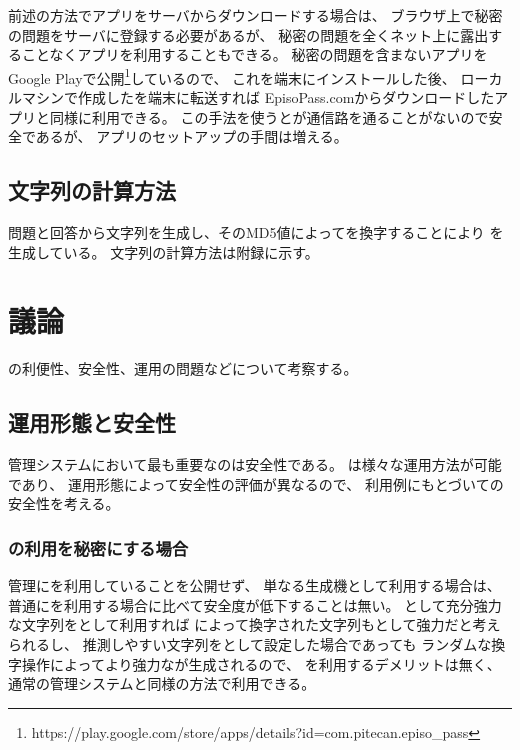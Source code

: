 \documentclass[twoside]{wiss}
\begin{document}
前述の方法で{\EP}アプリをサーバからダウンロードする場合は、
ブラウザ上で秘密の問題をサーバに登録する必要があるが、
秘密の問題を全くネット上に露出することなくアプリを利用することもできる。
秘密の問題を含まない{\EP}アプリをGoogle Playで公開\footnote{
 {\textsf{https://play.google.com/{\allowbreak}store/{\allowbreak}apps/{\allowbreak}details?{\allowbreak}id=com.{\allowbreak}pitecan.{\allowbreak}episo\_pass}}
}しているので、
これを端末にインストールした後、
ローカルマシンで作成した{\SQ}を端末に転送すれば
\textsf{EpisoPass.comから}ダウンロードしたアプリと同様に利用できる。
この手法を使うと{\SQ}が通信路を通ることがないので安全であるが、
アプリのセットアップの手間は増える。

\subsection{{\PW}文字列の計算方法}

問題と回答から文字列を生成し、そのMD5値によって{\SS}を換字することにより
{\PW}を生成している。
{\PW}文字列の計算方法は附録に示す。

\section{議論}

{\EP}の利便性、安全性、運用の問題などについて考察する。

\subsection{運用形態と安全性}

{\PW}管理システムにおいて最も重要なのは安全性である。
%
{\EP}は様々な運用方法が可能であり、
運用形態によって安全性の評価が異なるので、
利用例にもとづいて{\EP}の安全性を考える。

\subsubsection{\protect{\textsf{\EP}}の利用を秘密にする場合}
\label{pattern1}

{\PW}管理に{\EP}を利用していることを公開せず、
単なる{\PW}生成機として利用する場合は、
普通に{\PW}を利用する場合に比べて安全度が低下することは無い。
{\PW}として充分強力な文字列を{\SS}として利用すれば
{\EP}によって換字された文字列も{\PW}として強力だと考えられるし、
推測しやすい文字列を{\SS}として設定した場合であっても
ランダムな換字操作によってより強力な{\PW}が生成されるので、
{\EP}を利用するデメリットは無く、
通常の{\PW}管理システムと同様の方法で利用できる。
\end{document}
